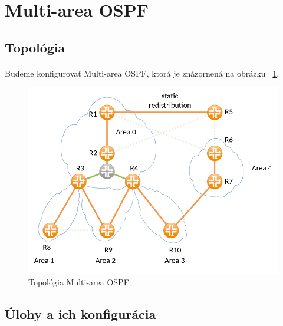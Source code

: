 \documentclass[12pt,twoside,a4paper]{article}
\begin{document}

\section*{Multi-area OSPF}
\subsection*{Topológia}
\paragraph{}
Budeme konfigurovať Multi-area OSPF, ktorá je znázornená na obrázku ~\ref{fig:multiarea_ospf_topo}.

\begin{figure}[!htb]
\centering
\includegraphics[width=12cm,keepaspectratio]{multiarea_ospf_topo}
\caption{Topológia Multi-area OSPF}
\label{fig:multiarea_ospf_topo}
\end{figure}

\subsection*{Úlohy a ich konfigurácia}
\end{document}
